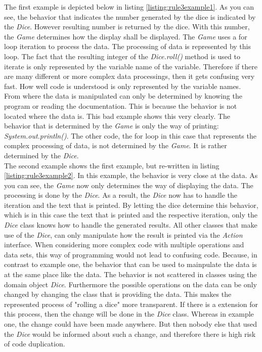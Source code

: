 The first example is depicted below in listing \ref{listing:rule3example1}. As you can see, the behavior that indicates the number generated by the dice is indicated by the \textit{Dice}. However resulting number is returned by the dice. With this number, the \textit{Game} determines how the  display shall be displayed. The \textit{Game} uses a for loop iteration to process the data. The processing of data is represented by this loop. The fact that the resulting integer of the \textit{Dice.roll()} method is used to iterate is only represented by the variable name of the variable. Therefore if there are many different or more complex data processings, then it gets confusing very fast. How well code is understood is only represented by the variable names. From where the data is manipulated can only be determined by knowing the program or reading the documentation. This is because the behavior is not located where the data is. This bad example shows this very clearly. The behavior that is determined by the \textit{Game} is only the way of printing: \textit{System.out.println()}. The other code, the for loop in this case that represents the complex processing of data, is not determined by the \textit{Game}. It is rather determined by the \textit{Dice}. 
\\

The second example shows the first example, but re-written in listing \ref{listing:rule3example2}. In this example, the behavior is very close at the data. As you can see, the \textit{Game} now only determines the way of displaying the data. The processing is done by the \textit{Dice}. As a result, the \textit{Dice} now has to handle the iteration and the text that is printed. By letting the dice determine this behavior, which is in this case the text that is printed and the respective iteration, only the \textit{Dice} class knows how to handle the generated results. All other classes that make use of the \textit{Dice}, can only manipulate how the result is printed via the \textit{Action} interface. 
When considering more complex code with multiple operations and data sets, this way of programming would not lead to confusing code. Because, in contrast to example one, the behavior that can be used to mainpulate the data is at the same place like the data. The behavior is not scattered in classes using the domain object \textit{Dice}. Furthermore the possible operations on the data can be only changed by changing the class that is providing the data. This makes the represented process of "rolling a dice" more transparent. If there is a extension for this process, then the change will be done in the \textit{Dice} class. Whereas in example one, the change could have been made anywhere. But then nobody else that used the \textit{Dice} would be informed about such a change, and therefore there is high risk of code duplication. 
\\

